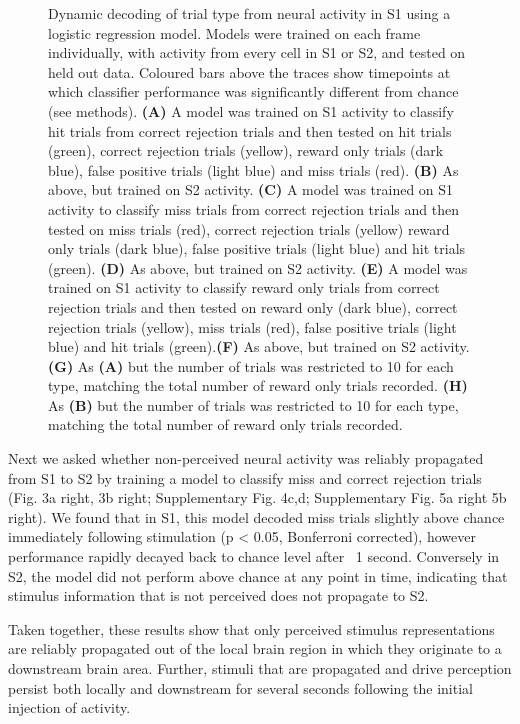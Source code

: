 \begin{figure}[h]
{Dynamic decoding of trial type from neural activity in S1 using a logistic regression model. Models were trained on each frame individually, with activity from every cell in S1 or S2, and tested on held out data. Coloured bars above the traces show timepoints at which classifier performance was significantly different from chance (see methods). \textbf{(A)} A model was trained on S1 activity to classify hit trials from correct rejection trials and then tested on hit trials (green), correct rejection trials (yellow), reward only trials (dark blue), false positive trials (light blue) and miss trials (red). \textbf{(B)} As above, but trained on S2 activity. \textbf{(C)} A model was trained on S1 activity to classify miss trials from correct rejection trials and then tested on miss trials (red), correct rejection trials (yellow) reward only trials (dark blue), false positive trials (light blue) and hit trials (green). \textbf{(D)} As above, but trained on S2 activity. \textbf{(E)} A model was trained on S1 activity to classify reward only trials from correct rejection trials and then tested on reward only (dark blue), correct rejection trials (yellow), miss trials (red), false positive trials (light blue) and hit trials (green).\textbf{(F)} As above, but trained on S2 activity. \textbf{(G)} As \textbf{(A)} but the number of trials was restricted to 10 for each type, matching the total number of reward only trials recorded. \textbf{(H)} As \textbf{(B)} but the number of trials was restricted to 10 for each type, matching the total number of reward only trials recorded.
} 
\label{fig:supp4}
\end{figure}

Next we asked whether non-perceived neural activity was reliably propagated from S1 to S2 by training a model to classify miss and correct rejection trials (Fig. 3a right, 3b right; Supplementary Fig. 4c,d; Supplementary Fig. 5a right 5b right). We found that in S1, this model decoded miss trials slightly above chance immediately following stimulation (p < 0.05, Bonferroni corrected), however performance rapidly decayed back to chance level after ~1 second. Conversely in S2, the model did not perform above chance at any point in time, indicating that stimulus information that is not perceived does not propagate to S2.

Taken together, these results show that only perceived stimulus representations are reliably propagated out of the local brain region in which they originate to a downstream brain area. Further, stimuli that are propagated and drive perception persist both locally and downstream for several seconds following the initial injection of activity.


